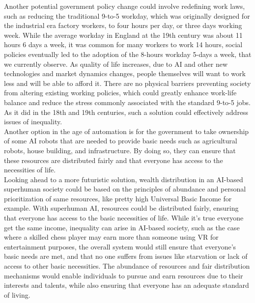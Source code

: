 \documentclass{article}
\begin{document}
Another potential government policy change could involve redefining work laws, such as reducing the traditional 9-to-5 workday, which was originally designed for the industrial era factory workers, to four hours per day, or three days working week. While the average workday in England at the 19th century was about 11 hours 6 days a week\cite{voth1998time}, it was common for many workers to work 14 hours, social policies eventually led to the adoption of the 8-hours workday 5-days a week, that we currently observe. As quality of life increases, due to AI and other new technologies and market dynamics changes, people themselves will want to work less and will be able to afford it. There are no physical barriers preventing society from altering existing working policies, which could greatly enhance work-life balance and reduce the stress commonly associated with the standard 9-to-5 jobs\cite{howard2015changing, schnall2016globalization}. As it did in the 18th and 19th centuries, such a solution could effectively address issues of inequality.\\

Another option in the age of automation is for the government to take ownership of some AI robots that are needed to provide basic needs such as agricultural robots, house building, and infrastructure. By doing so, they can ensure that these resources are distributed fairly and that everyone has access to the necessities of life.\\

Looking ahead to a more futuristic solution, wealth distribution in an AI-based superhuman society could be based on the principles of abundance and personal prioritization of same resources, like pretty high Universal Basic Income for example. With superhuman AI, resources could be distributed fairly, ensuring that everyone has access to the basic necessities of life. While it's true everyone get the same income, inequality can arise in AI-based society, such as the case where a skilled chess player may earn more than someone using VR for entertainment purposes, the overall system would still ensure that everyone's basic needs are met, and that no one suffers from issues like starvation or lack of access to other basic necessities. The abundance of resources and fair distribution mechanisms would enable individuals to pursue and earn resources due to their interests and talents, while also ensuring that everyone has an adequate standard of living.\\
\end{document}
